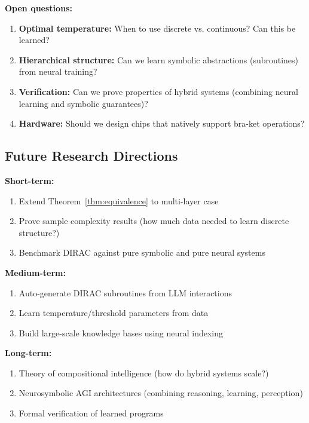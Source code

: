 \documentclass[11pt,a4paper]{article}
\theoremstyle{definition}
\begin{document}
\textbf{Open questions:}

\begin{enumerate}
\item \textbf{Optimal temperature:} When to use discrete vs. continuous? Can this be learned?

\item \textbf{Hierarchical structure:} Can we learn symbolic abstractions (subroutines) from neural training?

\item \textbf{Verification:} Can we prove properties of hybrid systems (combining neural learning and symbolic guarantees)?

\item \textbf{Hardware:} Should we design chips that natively support bra-ket operations?
\end{enumerate}

\subsection{Future Research Directions}

\textbf{Short-term:}
\begin{enumerate}
\item Extend Theorem~\ref{thm:equivalence} to multi-layer case
\item Prove sample complexity results (how much data needed to learn discrete structure?)
\item Benchmark DIRAC against pure symbolic and pure neural systems
\end{enumerate}

\textbf{Medium-term:}
\begin{enumerate}
\item Auto-generate DIRAC subroutines from LLM interactions
\item Learn temperature/threshold parameters from data
\item Build large-scale knowledge bases using neural indexing
\end{enumerate}

\textbf{Long-term:}
\begin{enumerate}
\item Theory of compositional intelligence (how do hybrid systems scale?)
\item Neurosymbolic AGI architectures (combining reasoning, learning, perception)
\item Formal verification of learned programs
\end{enumerate}
\end{document}
